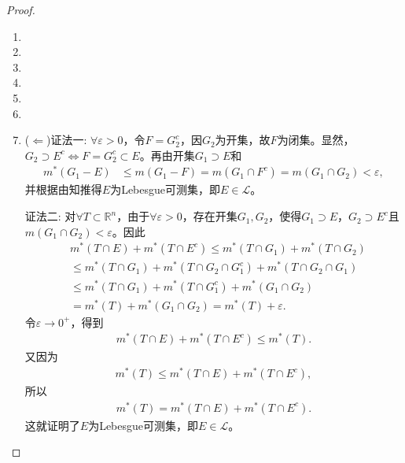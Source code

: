 \documentclass[../../main.tex]{subfiles}%
\begin{document}
\begin{proof}
\begin{enumerate}[(1)]
\item 

\item 

\item 

\item 

\item 

\item 

\item ($\Leftarrow$){\color{blue}证法一:} $\forall\varepsilon>0$，令$F=G_2^c$，因$G_2$为开集，故$F$为闭集。显然，$G_2\supset E^c \iff F=G_2^c\subset E$。再由开集$G_1\supset E$和
\begin{align*}
m^*(G_1-E) &\leqslant m(G_1-F) = m(G_1\cap F^c) = m(G_1\cap G_2) < \varepsilon,
\end{align*}
并根据由知推得$E$为Lebesgue可测集，即$E\in\mathscr{L}$。

{\color{blue}证法二:} 对$\forall T\subset\mathbb{R}^n$，由于$\forall\varepsilon>0$，存在开集$G_1,G_2$，使得$G_1\supset E$，$G_2\supset E^c$且$m(G_1\cap G_2)<\varepsilon$。因此
\begin{align*}
&m^*(T\cap E)+m^*(T\cap E^c) \leqslant m^*(T\cap G_1)+m^*(T\cap G_2) \\
&\leqslant m^*(T\cap G_1)+m^*(T\cap G_2\cap G_1^c)+m^*(T\cap G_2\cap G_1) \\
&\leqslant m^*(T\cap G_1)+m^*(T\cap G_1^c)+m^*(G_1\cap G_2) \\
&= m^*(T)+m^*(G_1\cap G_2) = m^*(T)+\varepsilon.
\end{align*}
令$\varepsilon\to 0^+$，得到
\begin{align*}
m^*(T\cap E)+m^*(T\cap E^c) \leqslant m^*(T).
\end{align*}
又因为
\begin{align*}
m^*(T) \leqslant m^*(T\cap E)+m^*(T\cap E^c),
\end{align*}
所以
\begin{align*}
m^*(T) = m^*(T\cap E)+m^*(T\cap E^c).
\end{align*}
这就证明了$E$为Lebesgue可测集，即$E\in\mathscr{L}$。


\end{enumerate}
\end{proof}
\end{document}
